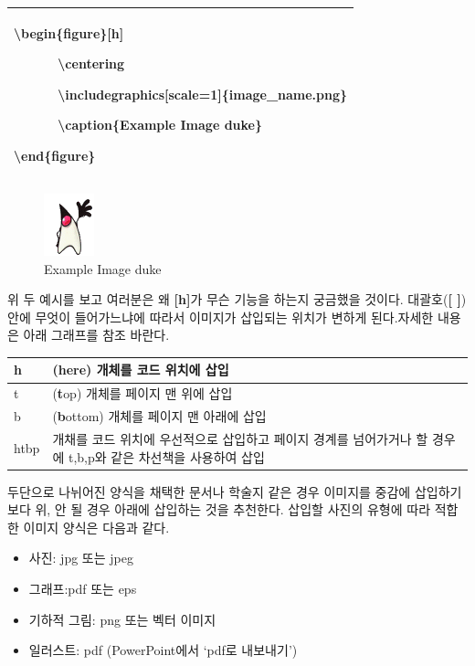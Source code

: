 \documentclass[12pt]{article}
\begin{document}
	\begin{tabularx}{\textwidth \onehalfspacing}{|X|}
		\hline
		\textbackslash begin\{figure\}[h]
		
		\ \ \ \ \ \ \textbackslash centering
		
		\ \ \ \ \ \ \textbackslash includegraphics[scale=1]\{image\_name.png\}
		
		\ \ \ \ \ \ \textbackslash caption\{Example Image duke\}
		
		\textbackslash end\{figure\}\\
		\hline
	\end{tabularx}
	\begin{figure}[h]
		\centering
		\includegraphics[scale=1]{T6.png}
		\caption{Example Image duke}
	\end{figure}
	\clearpage 위 두 예시를 보고 여러분은 왜 \textbf{[h]}가 무슨 기능을 하는지 궁금했을 것이다. 대괄호(\textbf{[ ]})안에 무엇이 들어가느냐에 따라서 이미지가 삽입되는 위치가 변하게 된다.자세한 내용은 아래 그래프를 참조 바란다.\newline
	
	\begin{tabularx}{\textwidth \onehalfspacing}{|l|X|}
		\hline
		h&(\textbf{h}ere) 개체를 코드 위치에 삽입\\
		\hline
		t&(\textbf{t}op) 개체를 페이지 맨 위에 삽입\\
		\hline
		b&(\textbf{b}ottom) 개체를 페이지 맨 아래에 삽입\\
		\hline
		htbp& 개채를 코드 위치에 우선적으로 삽입하고 페이지 경계를 넘어가거나 할 경우에 t,b,p와 같은 차선책을 사용하여 삽입\\
		\hline
	\end{tabularx}
	\newline\newline
	두단으로 나뉘어진 양식을 채택한 문서나 학술지 같은 경우 이미지를 중감에 삽입하기 보다 위, 안 될 경우 아래에 삽입하는 것을 추천한다.
	\newline\newline
	삽입할 사진의 유형에 따라 적합한 이미지 양식은 다음과 같다.
	\begin{itemize}
		\item 사진: jpg 또는 jpeg
		\item 그래프:pdf 또는 eps
		\item 기하적 그림: png 또는 벡터 이미지
		\item 일러스트: pdf (PowerPoint에서 `pdf로 내보내기')
	\end{itemize}
	\clearpage
\end{document}
